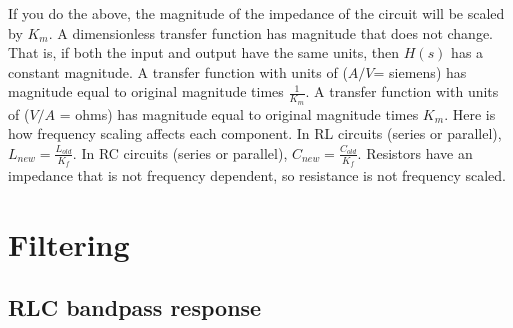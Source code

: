 \documentclass[nobib]{tufte-handout}
\begin{document}
If you do the above, the magnitude of 
the impedance of the circuit will be 
scaled by $K_m$. 
A dimensionless transfer function has magnitude that
does not change. That is, if both 
the input and output have the same 
units, then $H(s)$ has a constant 
magnitude. 
A transfer function with units of ($A/V$= siemens) has
magnitude equal to original magnitude times $\frac{1}{K_m}$.
A transfer function with units of ($V/A$ = ohms) has
magnitude equal to original magnitude times $K_m$.
Here is how frequency scaling affects each component. 
In RL circuits (series or parallel), $L_{new} = \frac{L_{old}}{K_f}$.
In RC circuits (series or parallel), $C_{new} = \frac{C_{old}}{K_f}$. 
Resistors have an impedance that is not frequency dependent, 
so resistance is not frequency scaled. 

\section{Filtering}

\subsection{RLC bandpass response}
\end{document}
